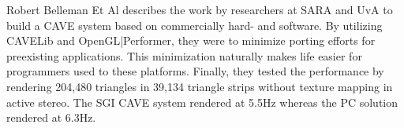 %	

Robert Belleman Et Al describes the work by researchers at SARA and UvA to build a CAVE system based on commercially hard- and software. By utilizing CAVELib and OpenGL|Performer, they were to minimize porting efforts for preexisting applications. This minimization naturally makes life easier for programmers used to these platforms. Finally, they tested the performance by rendering 204,480 triangles in 39,134 triangle strips without texture mapping in active stereo. The SGI CAVE system rendered at 5.5Hz whereas the PC solution rendered at 6.3Hz.

\filbreak
{}

%	

